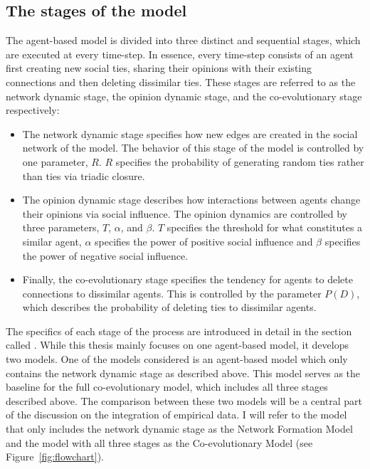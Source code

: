 \documentclass[11pt]{article}
\begin{document}
\subsection{The stages of the model}
The agent-based model is divided into three distinct and sequential stages, which are executed at every time-step.
In essence, every time-step consists of an agent first creating new social ties, sharing their opinions with their existing connections and then deleting dissimilar ties.
These stages are referred to as the network dynamic stage, the opinion dynamic stage, and the co-evolutionary stage respectively: 

\begin{itemize}
    \item The network dynamic stage specifies how new edges are created in the social network of the model. The behavior of this stage of the model is controlled by one parameter, $R$. $R$ specifies the probability of generating random ties rather than ties via triadic closure.
    \item The opinion dynamic stage describes how interactions between agents change their opinions via social influence. The opinion dynamics are controlled by three parameters, $T$, $\alpha$, and $\beta$. $T$ specifies the threshold for what constitutes a similar agent, $\alpha$ specifies the power of positive social influence and $\beta$ specifies the power of negative social influence.
    \item Finally, the co-evolutionary stage specifies the tendency for agents to delete connections to dissimilar agents. This is controlled by the parameter $P(D)$, which describes the probability of deleting ties to dissimilar agents.
\end{itemize}

\noindent The specifics of each stage of the process are introduced in detail in the section called \textit{}. While this thesis mainly focuses on one agent-based model, it develops two models. 
One of the models considered is an agent-based model which only contains the network dynamic stage as described above. This model serves as the baseline for the full co-evolutionary model, which includes all three stages described above. The comparison between these two models will be a central part of the discussion on the integration of empirical data. I will refer to the model that only includes the network dynamic stage as the Network Formation Model and the model with all three stages as the Co-evolutionary Model (see Figure~\ref{fig:flowchart}).
\end{document}
